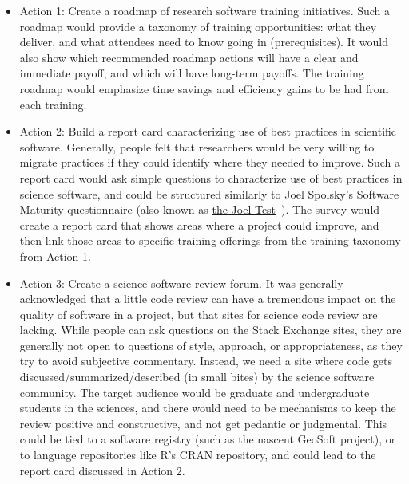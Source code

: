 \documentclass[11pt, oneside]{amsart}
\begin{document}
\begin{itemize}
    \item Action 1: Create a roadmap of research software training initiatives. Such a roadmap would
        provide a taxonomy of training opportunities: what they deliver, and what attendees need to know
        going in (prerequisites). It would also show which recommended roadmap actions will have a clear
        and immediate payoff, and which will have long-term payoffs.  The training roadmap would emphasize
        time savings and efficiency gains to be had from each training.

    \item Action 2: Build a report card characterizing use of best practices in scientific software. Generally,
        people felt that researchers would be very willing to migrate practices if they could identify
        where they needed to improve. Such a report card would ask simple questions to characterize use of best
        practices in science software, and could be structured similarly to Joel Spolsky's Software Maturity
        questionnaire (also known as \href{http://www.joelonsoftware.com/articles/fog0000000043.html}{the Joel Test}~\cite{joel-test}).  The survey would create a
        report card that shows areas where a project could improve, and then link those areas to specific
        training offerings from the training taxonomy from Action 1.

    \item Action 3: Create a science software review forum.  It was generally acknowledged that a little code review
        can have a tremendous impact on the quality of software in a project, but that sites for science code
        review are lacking.  While people can ask questions on the Stack Exchange sites, they are generally not open
        to questions of style, approach, or appropriateness, as they try to avoid subjective commentary.   Instead,
        we need a site where code gets discussed/summarized/described (in small bites) by the science software community.
        The target audience would be graduate and undergraduate students in the sciences, and there would need to be
        mechanisms to keep the review positive and constructive, and not get pedantic or judgmental.
        This could be tied to a software registry (such as the nascent GeoSoft project), or to language repositories like
        R's CRAN repository, and could lead to the report card discussed in Action 2.
\end{itemize}
\end{document}
